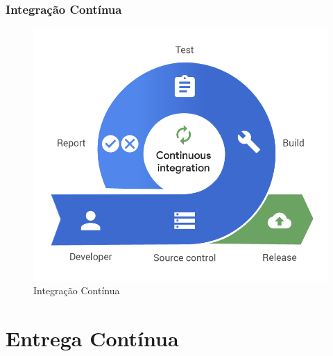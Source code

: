 \documentclass[
	9pt, %
	t, %
]{beamer}
\begin{document}

\begin{frame}
	\frametitle{Integração Contínua}
	\begin{figure}
		\centering
		\includegraphics[width=0.7\linewidth]{cont_integ.png}
		\caption{Integração Contínua}
		\label{fig:ci}
	\end{figure}

\end{frame}


\section{Entrega Contínua}

\end{document}
